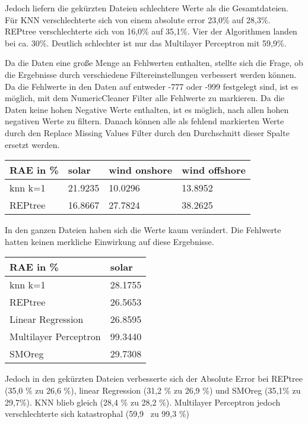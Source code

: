 \documentclass[letterpaper]{article} %
\begin{document}
    Jedoch liefern die gekürzten Dateien schlechtere Werte als die Gesamtdateien. Für KNN verschlechterte sich von einem absolute error 23,0\% auf 28,3\%. REPtree verschlechterte sich von 16,0\% auf 35,1\%. Vier der Algorithmen landen bei ca. 30\%. Deutlich schlechter ist nur das Multilayer Perceptron mit 59,9\%.

    Da die Daten eine große Menge an Fehlwerten enthalten, stellte sich die Frage, ob die Ergebnisse durch verschiedene Filtereinstellungen verbessert werden können. Da die Fehlwerte in den Daten auf entweder -777 oder -999 festgelegt sind, ist es möglich, mit dem NumericCleaner Filter alle Fehlwerte zu markieren. Da die Daten keine hohen Negative Werte enthalten, ist es möglich, nach allen hohen negativen Werte zu filtern. Danach können alle als fehlend markierten Werte durch den Replace Missing Values Filter durch den Durchschnitt dieser Spalte ersetzt werden.
    \hfill\break
    \begin{center}
        \begin{tabular}{|l||l|l|l|}
            \hline
            RAE in \%&solar&wind onshore&wind offshore\\
            \hline
            \hline
            knn k=1&21.9235&10.0296&13.8952\\
            \hline
            REPtree&16.8667&27.7824&38.2625\\
            \hline
        \end{tabular}
    \end{center}
    \hfill\break
    In den ganzen Dateien haben sich die Werte kaum verändert. Die Fehlwerte hatten keinen merkliche Einwirkung auf diese Ergebnisse.
    \hfill\break
    \begin{center}
        \begin{tabular}{|l||l|}
            \hline
            RAE in \%&solar\\
            \hline
            \hline
            knn k=1&28.1755\\
            \hline
            REPtree&26.5653\\
            \hline
            Linear Regression&26.8595\\
            \hline
            Multilayer Perceptron&99.3440\\
            \hline
            SMOreg&29.7308\\
            \hline
        \end{tabular}
    \end{center}
    \hfill\break
    Jedoch in den gekürzten Dateien verbesserte sich der Absolute Error bei REPtree (35,0 \% zu 26,6 \%), linear Regression (31,2 \% zu 26,9 \%) und SMOreg (35,1\% zu 29,7\%). KNN blieb gleich (28,4 \% zu 28,2 \%). Multilayer Perceptron jedoch verschlechterte sich katastrophal (59,9 \ zu 99,3 \%)
\end{document}
